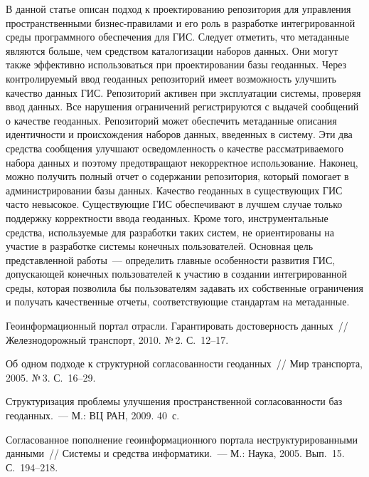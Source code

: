 \begin{multicols}{2}
      В данной статье описан подход к проектированию репозитория для управления 
пространственными бизнес-правилами и его роль в разработке интегрированной среды 
программного обеспечения для ГИС. Следует отметить, что метаданные являются больше, 
чем средством каталогизации наборов данных. Они могут также эффективно 
использоваться при проектировании базы геоданных. Через контролируемый ввод 
геоданных репозиторий имеет возможность улучшить качество данных ГИС. Репозиторий 
активен при эксплуатации сис\-те\-мы, проверяя ввод данных. Все нарушения ограничений 
регистрируются с выдачей сообщений о качестве геоданных. Репозиторий может 
обеспечить метаданные описания идентичности и происхождения наборов данных, 
введенных в систему. Эти два средства сообщения улучшают осведомленность о качестве 
рассматриваемого набора данных и поэтому предотвращают некорректное использование. 
Наконец, можно получить полный отчет о содержании репозитория, который помогает в 
администрировании базы данных. Качество геоданных в существующих ГИС часто 
невысокое. Существующие ГИС обеспечивают в лучшем случае только поддержку 
корректности ввода геоданных. Кроме того, инструментальные средства, используемые для 
разработки таких систем, не ориентированы на участие в разработке системы конечных 
пользователей. Основная цель представленной работы~--- определить главные особенности 
развития ГИС, допускающей конечных пользователей к учас\-тию в со\-зда\-нии 
интегрированной среды, которая поз\-во\-ли\-ла бы пользователям задавать их собственные 
ограничения и получать качественные отчеты, соответствующие стандартам на 
метаданные.

{\small\frenchspacing
{%
\begin{thebibliography}{9}

Геоинформационный портал отрасли. Гарантировать достоверность данных~// 
Железнодорожный транспорт, 2010. №\,2. С.~12--17.


Об одном подходе к структурной согласованности геоданных~// Мир транспорта, 2005. 
№\,3. С.~16--29.

Структуризация проблемы улучшения пространственной согласованности баз 
геоданных.~--- М.: ВЦ РАН, 2009. 40~с.

Согласованное пополнение геоинформационного портала неструктурированными 
данными~// Системы и средства информатики.~--- М.: Наука, 2005. Вып.~15. С.~194--218.


\end{thebibliography}}}
\end{multicols}
